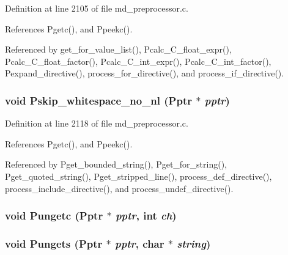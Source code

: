 Definition at line 2105 of file md\_\-preprocessor.c.

References Pgetc(), and Ppeekc().

Referenced by get\_\-for\_\-value\_\-list(), Pcalc\_\-C\_\-float\_\-expr(), Pcalc\_\-C\_\-float\_\-factor(), Pcalc\_\-C\_\-int\_\-expr(), Pcalc\_\-C\_\-int\_\-factor(), Pexpand\_\-directive(), process\_\-for\_\-directive(), and process\_\-if\_\-directive().
\subsubsection{\setlength{\rightskip}{0pt plus 5cm}void Pskip\_\-whitespace\_\-no\_\-nl (\bf{Pptr} $\ast$ {\em pptr})}\label{md__preprocessor_8h_f80ca7eae5033482494d22ef8ecdfbfb}




Definition at line 2118 of file md\_\-preprocessor.c.

References Pgetc(), and Ppeekc().

Referenced by Pget\_\-bounded\_\-string(), Pget\_\-for\_\-string(), Pget\_\-quoted\_\-string(), Pget\_\-stripped\_\-line(), process\_\-def\_\-directive(), process\_\-include\_\-directive(), and process\_\-undef\_\-directive().
\subsubsection{\setlength{\rightskip}{0pt plus 5cm}void Pungetc (\bf{Pptr} $\ast$ {\em pptr}, int {\em ch})}\label{md__preprocessor_8h_f2ff8c54f9e8cdb9a10ab1580d80ea13}


\subsubsection{\setlength{\rightskip}{0pt plus 5cm}void Pungets (\bf{Pptr} $\ast$ {\em pptr}, char $\ast$ {\em string})}\label{md__preprocessor_8h_36b949666633221b85a46da0c6030e9e}


